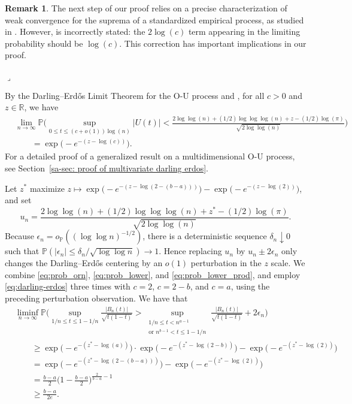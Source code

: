\documentclass[10pt]{article}
\def\P{\mathbb{P}}
\theoremstyle{definition}
\newtheorem{remark_tmp}{Remark}
\newenvironment{remark}
	{ \begin{remark_tmp} 	}
	{ 
		\medskip\hfill{\LARGE$\lrcorner$}
		\end{remark_tmp} 
	}
\theoremstyle{remark}
\begin{document}
\begin{remark}\label{remark: Eicker (1979) error}
    The next step of our proof relies on a precise characterization of weak convergence for the suprema of a standardized empirical process, as studied in \citep{eicker1979asymptotic}. However, 
    \citet[Theorem 5]{eicker1979asymptotic} is incorrectly stated: the $2\log(c)$ term appearing in the limiting probability should be $\log(c)$. This correction has important implications in our proof.
\end{remark}

By the Darling--Erd\H{o}s Limit Theorem for the O-U process \citep[Theorem 1.9.1]{csorgo1981strong} and \citep[Theorem 2.2 and the correct version of Theorem 5]{eicker1979asymptotic}, for all $ c > 0 $ and $ z \in \mathbb{R} $, we have
\begin{align}\label{eq:darling-erdos}
    \nonumber
    & \lim_{n\to\infty} \mathbb{P}\bigg(
        \sup_{0 \leq t \leq (c+o(1))\log(n)} |U(t)|
        <
        \frac{
            2\log\log(n) + (1/2)\log\log\log(n)
            + z - (1/2)\log(\pi)
        }{\sqrt{2\log\log(n)}}
    \bigg) \\
    & \qquad = \exp\Big(-e^{-(z-\log(c))}\Big).
\end{align}
For a detailed proof of a generalized result on a multidimensional O-U process, see Section~\ref{sa-sec: proof of multivariate darling erdos}.

Let $ z^* $ maximize $ z \mapsto \exp\big(-e^{-(z-\log(2-(b-a)))}\big) - \exp\big(-e^{-(z-\log(2))}\big) $, %
and set
\[
    u_n =
    \frac{
        2\log\log(n) + (1/2)\log\log\log(n)
        + z^* - (1/2)\log(\pi)
    }{\sqrt{2\log\log(n)}}.
\]
Because $\epsilon_n=o_{\P}((\log\log n)^{-1/2})$, there is a deterministic sequence $\delta_n\downarrow0$ such that $\P(|\epsilon_n|\leq \delta_n/\sqrt{\log\log n})\to1$. Hence replacing $u_n$ by $u_n\pm 2\epsilon_n$ only changes the Darling--Erd\H{o}s centering by an $o(1)$ perturbation in the $z$ scale.
We combine \eqref{eq:prob_orn}, \eqref{eq:prob_lower}, and \eqref{eq:prob_lower_prod}, and employ \eqref{eq:darling-erdos} three times with $ c = 2 $, $ c = 2-b $, and $ c = a $, using the preceding perturbation observation. We have that 
{\small
\begin{align}
    \nonumber & \liminf_{n\rightarrow\infty}\mathbb{P}\bigg( \sup_{ 1/n \leq t \leq 1-1/n} \frac{|B_n(t)|}{\sqrt{t(1-t)}} > \sup_{\substack{1/n \leq t < n^{a-1}\\ \text{or } n^{b-1} < t \leq 1-1/n}} \frac{|B_n(t)|}{\sqrt{t(1-t)}} + 2\epsilon_n\bigg) \\
    \nonumber & \qquad \geq \exp\Big(-e^{-(z^*-\log(a))}\Big) \cdot \exp\Big(-e^{-(z^*-\log(2-b))}\Big) - \exp\Big(-e^{-(z^*-\log(2))}\Big) 
    \\ & \qquad  =
    \nonumber \exp\Big(-e^{-(z^*-\log(2-(b-a)))}\Big) - \exp\Big(-e^{-(z^*-\log(2))}\Big) \\ 
    \nonumber & \qquad = \frac{b-a}{2}\bigg(1-\frac{b-a}{2}\bigg)^{\frac{2}{b-a}-1}
    \\ & \qquad \geq \frac{b-a}{2e}.
\end{align}
}
\end{document}
